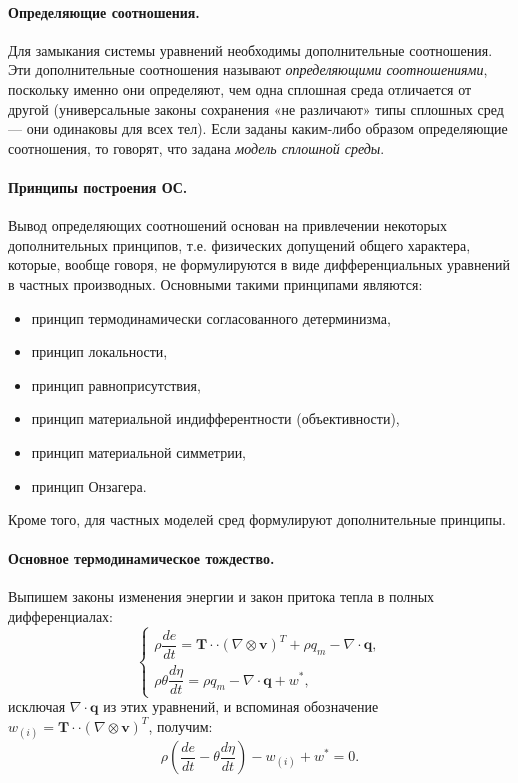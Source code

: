 \paragraph{Определяющие соотношения.}
Для замыкания системы уравнений необходимы дополнительные соотношения. Эти дополнительные
соотношения называют \emph{определяющими соотношениями}, поскольку именно они определяют, чем одна
сплошная среда отличается от другой (универсальные законы сохранения «не различают» типы
сплошных сред — они одинаковы для всех тел). Если заданы каким-либо образом определяющие
соотношения, то говорят, что задана \emph{модель сплошной среды}.

\paragraph{Принципы построения ОС.}
Вывод определяющих соотношений основан на привлечении некоторых дополнительных принципов,
т.е. физических допущений общего характера, которые, вообще говоря, не формулируются в виде
дифференциальных уравнений в частных производных. Основными такими принципами являются:
\begin{itemize}
  \item принцип термодинамически согласованного детерминизма,
  \item принцип локальности,
  \item принцип равноприсутствия,
  \item принцип материальной индифферентности (объективности),
  \item принцип материальной симметрии,
  \item принцип Онзагера.
\end{itemize}
Кроме того, для частных моделей сред формулируют дополнительные принципы.

\paragraph{Основное термодинамическое тождество.}
Выпишем законы изменения энергии и закон притока тепла в полных дифференциалах:
\[
  \begin{cases}
    \rho \dfrac{de}{dt} =
    \mathbf{T} \cdot\cdot(\nabla \otimes \mathbf{v})^T +
    \rho q_m - \nabla\cdot\mathbf{q}, \\
    \rho\theta \dfrac{d\eta}{dt} =
    \rho q_m - \nabla \cdot \mathbf{q} + w^*,
  \end{cases}
\]
исключая $\nabla \cdot \mathbf{q}$ из этих уравнений, и вспоминая обозначение $w_{(i)} = \mathbf{T} \cdot\cdot (\nabla \otimes \mathbf{v})^T$, получим:
\[
  \rho \left( \dfrac{de}{dt} - \theta \dfrac{d\eta}{dt} \right) - w_{(i)} + w^* = 0.
\]

